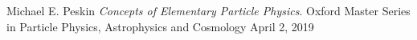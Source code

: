 
\cleardoublepage
{}
\begin{thebibliography}{99}

Michael E. Peskin
\textit{Concepts of Elementary Particle Physics}.
Oxford Master Series in Particle Physics, Astrophysics and Cosmology
April 2, 2019

\end{thebibliography}
